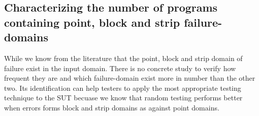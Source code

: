 \subsection{Characterizing the number of programs containing point, block and strip failure-domains}
While we know from the literature that the point, block and strip domain of failure exist in the input domain. There is no concrete study to verify how frequent they are and which failure-domain exist more in number than the other two. Its identification can help testers to apply the most appropriate testing technique to the SUT becuase we know that random testing performs better when errors forms block and strip domains as against point domains.
	




